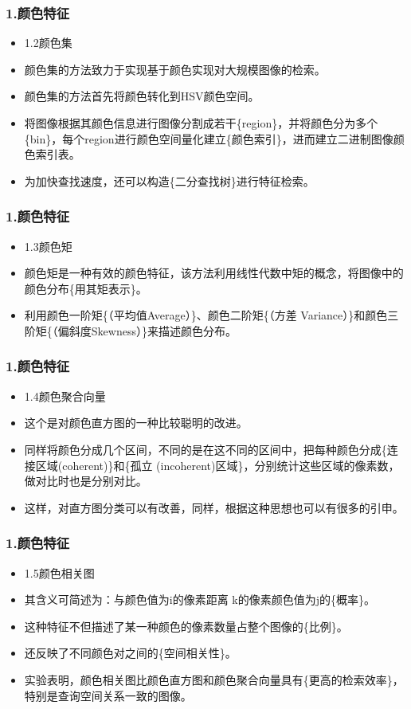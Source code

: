 \documentclass[notheorems,mathserif,table,compress]{beamer}  %
\begin{document}
\begin{frame}
  \frametitle{1.颜色特征}
  \begin{itemize}
  \item 1.2颜色集
  \item 颜色集的方法致力于实现基于颜色实现对大规模图像的检索。
  \item 颜色集的方法首先将颜色转化到HSV颜色空间。  
  \item 将图像根据其颜色信息进行图像分割成若干\{region\}，并将颜色分为多个\{bin\}，每个region进行颜色空间量化建立\{颜色索引\}，进而建立二进制图像颜色索引表。
  \item 为加快查找速度，还可以构造\{二分查找树\}进行特征检索。
  \end{itemize}
\end{frame}%

\begin{frame}
  \frametitle{1.颜色特征}
  \begin{itemize}
  \item 1.3颜色矩
  \item 颜色矩是一种有效的颜色特征，该方法利用线性代数中矩的概念，将图像中的颜色分布\{用其矩表示\}。
  \item 利用颜色一阶矩\{（平均值Average）\}、颜色二阶矩\{（方差 Variance）\}和颜色三阶矩\{（偏斜度Skewness）\}来描述颜色分布。
  \end{itemize}
\end{frame}


\begin{frame}
  \frametitle{1.颜色特征}
  \begin{itemize}
  \item 1.4颜色聚合向量
  \item 这个是对颜色直方图的一种比较聪明的改进。
  \item 同样将颜色分成几个区间，不同的是在这不同的区间中，把每种颜色分成\{连接区域(coherent)\}和\{孤立 (incoherent)区域\}，分别统计这些区域的像素数，做对比时也是分别对比。
   \item 这样，对直方图分类可以有改善，同样，根据这种思想也可以有很多的引申。
  \end{itemize}
\end{frame}

\begin{frame}
  \frametitle{1.颜色特征}
  \begin{itemize}
  \item 1.5颜色相关图
  \item 其含义可简述为：与颜色值为i的像素距离 k的像素颜色值为j的\{概率\}。
  \item 这种特征不但描述了某一种颜色的像素数量占整个图像的\{比例\}。
  \item 还反映了不同颜色对之间的\{空间相关性\}。
  \item 实验表明，颜色相关图比颜色直方图和颜色聚合向量具有\{更高的检索效率\}，特别是查询空间关系一致的图像。
  \end{itemize}
\end{frame}
\end{document}
